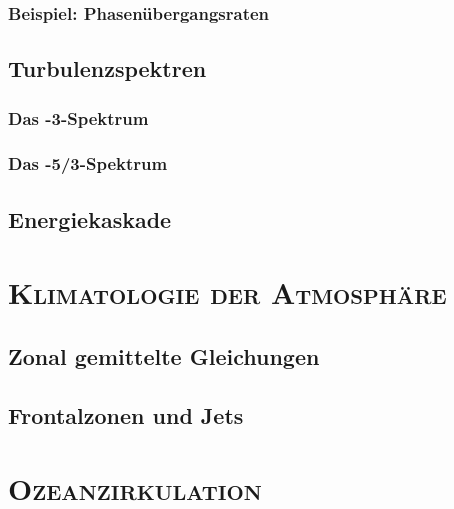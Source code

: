 \documentclass{book}
\begin{document}
\subsection{Beispiel: Phasenübergangsraten}
\label{sec:beispiel:phasenuebergangsraten}

\section{Turbulenzspektren}
\label{sec:turbulenzspektren}

\subsection{Das -3-Spektrum}
\label{sec:das_-3-spektrum}

\subsection{Das -5/3-Spektrum}
\label{sec:das_-5/3-spektrum}

\section{Energiekaskade}
\label{sec:energiekaskade}

\chapter{\normalfont\textsc{Klimatologie der Atmosphäre}}
\label{chap:klimatologie_der_atmosphaere}

\section{Zonal gemittelte Gleichungen}
\label{sec:zonal_gemittelte_gleichungen}

\section{Frontalzonen und Jets}
\label{sec:frontalzonen_und_jets}

\chapter{\normalfont\textsc{Ozeanzirkulation}}
\label{chap:ozeanzirkulation}
\end{document}
